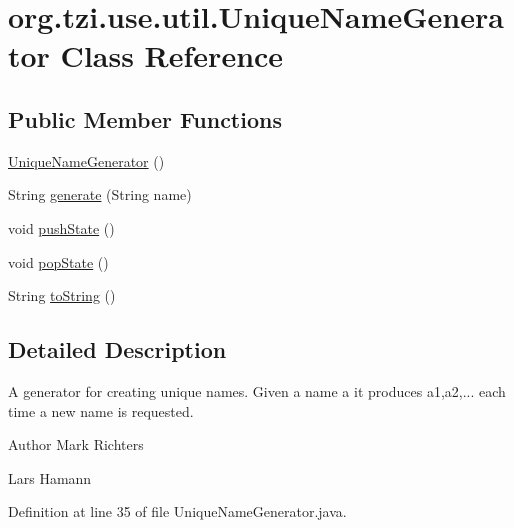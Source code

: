 \hypertarget{classorg_1_1tzi_1_1use_1_1util_1_1_unique_name_generator}{\section{org.\-tzi.\-use.\-util.\-Unique\-Name\-Generator Class Reference}
\label{classorg_1_1tzi_1_1use_1_1util_1_1_unique_name_generator}
}
\subsection*{Public Member Functions}
\begin{DoxyCompactItemize}
\item 
\hyperlink{classorg_1_1tzi_1_1use_1_1util_1_1_unique_name_generator_ad99f5ac1870529b342d084d9b6957a0c}{Unique\-Name\-Generator} ()
\item 
String \hyperlink{classorg_1_1tzi_1_1use_1_1util_1_1_unique_name_generator_a6d4b1e8850f3f6733d5911da97f61389}{generate} (String name)
\item 
void \hyperlink{classorg_1_1tzi_1_1use_1_1util_1_1_unique_name_generator_aa1fa9fd278f9e8f5bc18e7e9e8e62d05}{push\-State} ()
\item 
void \hyperlink{classorg_1_1tzi_1_1use_1_1util_1_1_unique_name_generator_a72ceec37689c4769d3f2e2cc2912a664}{pop\-State} ()
\item 
String \hyperlink{classorg_1_1tzi_1_1use_1_1util_1_1_unique_name_generator_a2512d030e1c62bb4d3316e1502f1a6c5}{to\-String} ()
\end{DoxyCompactItemize}


\subsection{Detailed Description}
A generator for creating unique names. Given a name a it produces a1,a2,... each time a new name is requested.

\begin{DoxyAuthor}{Author}
Mark Richters 

Lars Hamann 
\end{DoxyAuthor}


Definition at line 35 of file Unique\-Name\-Generator.\-java.



